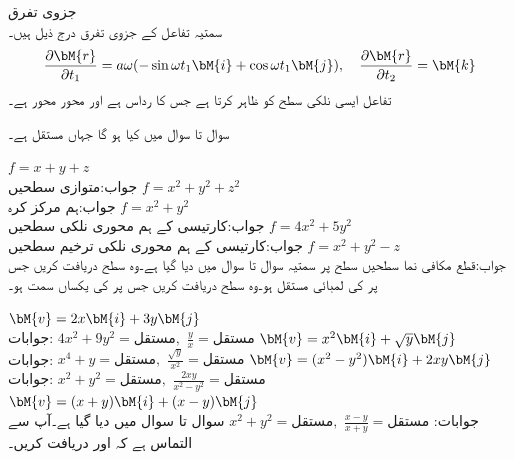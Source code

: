 \quad جزوی تفرق\\
سمتیہ  تفاعل  کے جزوی تفرق درج ذیل ہیں۔ 
\begin{align*}
\frac{\partial \bM{r}}{\partial t_1}=a\omega (-\sin \omega t_1\bM{i}+\cos \omega t_1\bM{j}),\quad \frac{\partial \bM{r}}{\partial t_2}=\bM{k}
\end{align*}
تفاعل  ایسی نلکی سطح کو ظاہر کرتا ہے جس کا رداس  ہے  اور محور محور  ہے۔ 


سوال  تا سوال  میں   کیا ہو گا جہاں  مستقل ہے۔

\quad
$f=x+y+z$\\
جواب:متوازی سطحیں
\quad
$f=x^2+y^2+z^2$\\
جواب:ہم مرکز کرہ
\quad
$f=x^2+y^2$\\
جواب:کارتیسی   کے ہم محوری نلکی سطحیں
\quad
$f=4x^2+5y^2$\\
جواب:کارتیسی   کے ہم محوری نلکی ترخیم سطحیں
\quad
$f=x^2+y^2-z$\\
جواب:قطع مکافی نما سطحیں
 سطح پر سمتیہ  سوال  تا سوال  میں دیا گیا ہے۔وہ سطح دریافت کریں جس پر  کی لمبائی مستقل ہو۔وہ سطح دریافت کریں جس پر   کی یکساں سمت ہو۔ 

\quad 
$\bM{v}=2x\bM{i}+3y\bM{j}$\\
جوابات:
$4x^2+9y^2=\text{مستقل},\,\, \tfrac{y}{x}=\text{مستقل}$
\quad 
$\bM{v}=x^2\bM{i}+\sqrt{y}\bM{j}$\\
جوابات:
$x^4+y=\text{مستقل},\,\, \tfrac{\sqrt{y}}{x^2}=\text{مستقل}$
\quad 
$\bM{v}=(x^2-y^2)\bM{i}+2xy\bM{j}$\\
جوابات:
$x^2+y^2=\text{مستقل},\,\, \tfrac{2xy}{x^2-y^2}=\text{مستقل}$
\quad 
$\bM{v}=(x+y)\bM{i}+(x-y)\bM{j}$\\
جوابات:
$x^2+y^2=\text{مستقل},\,\, \tfrac{x-y}{x+y}=\text{مستقل}$
سوال  تا سوال  میں  دیا گیا ہے۔آپ سے التماس ہے کہ  اور   دریافت کریں۔

